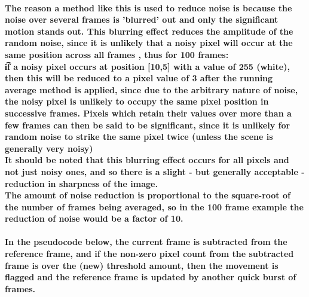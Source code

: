 \documentclass[11pt]{article} %
\begin{document}
\paragraph{The reason a method like this is used to reduce noise is because the noise over several frames is 'blurred' out and only the significant motion stands out. This blurring effect reduces the amplitude of the random noise, since it is unlikely that a noisy pixel will occur at the same position across all frames , thus for 100 frames: \\\t if a noisy pixel occurs at position [10,5] with a value of 255 (white), then this will be reduced to a pixel value of 3 after the running average method is applied, since due to the arbitrary nature of noise, the noisy pixel is unlikely to occupy the same pixel position in successive frames. Pixels which retain their values over more than a few frames can then be said to be significant, since it is unlikely for random noise to strike the same pixel twice (unless the scene is generally very noisy)\\
It should be noted that this blurring effect occurs for all pixels and not just noisy ones, and so there is a slight - but generally acceptable - reduction in sharpness of the image.\\
The amount of noise reduction is proportional to the square-root of the number of frames being averaged, so in the 100 frame example the reduction of noise would be a factor of 10.}
\paragraph{
In the pseudocode below, the current frame is subtracted from the reference frame, and if the non-zero pixel count from the subtracted frame is over the (new) threshold amount, then the movement is flagged and the reference frame is updated by another quick burst of frames.
}
\begin{frame}[fragile]
	
\end{frame}
\end{document}
